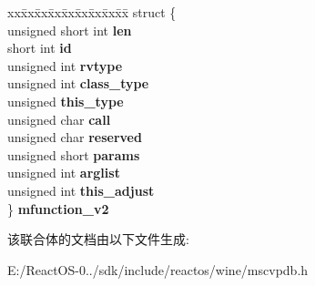 \begin{DoxyCompactItemize}
\begin{tabbing}
\end{tabbing}\item 
\mbox{\label{unioncodeview__type_aceaff242a3d14fd7361bb6ffb3e94cbe}} 
\begin{tabbing}
xx\=xx\=xx\=xx\=xx\=xx\=xx\=xx\=xx\=\kill
struct \{\\
\>unsigned short int {\bfseries len}\\
\>short int {\bfseries id}\\
\>unsigned int {\bfseries rvtype}\\
\>unsigned int {\bfseries class\_type}\\
\>unsigned {\bfseries this\_type}\\
\>unsigned char {\bfseries call}\\
\>unsigned char {\bfseries reserved}\\
\>unsigned short {\bfseries params}\\
\>unsigned int {\bfseries arglist}\\
\>unsigned int {\bfseries this\_adjust}\\
\} {\bfseries mfunction\_v2}\\

\end{tabbing}\end{DoxyCompactItemize}


该联合体的文档由以下文件生成\+:\begin{DoxyCompactItemize}
\item 
E\+:/\+React\+O\+S-\/0../sdk/include/reactos/wine/mscvpdb.\+h\end{DoxyCompactItemize}
